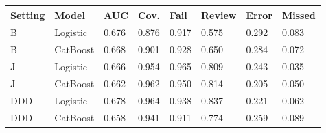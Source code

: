 \begin{tabular}{llllllll}
\toprule
Setting & Model & AUC & Cov. & Fail & Review & Error & Missed\\
\midrule
B & Logistic & 0.676 & 0.876 & 0.917 & 0.575 & 0.292 & 0.083\\
B & CatBoost & 0.668 & 0.901 & 0.928 & 0.650 & 0.284 & 0.072\\
J & Logistic & 0.666 & 0.954 & 0.965 & 0.809 & 0.243 & 0.035\\
J & CatBoost & 0.662 & 0.962 & 0.950 & 0.814 & 0.205 & 0.050\\
DDD & Logistic & 0.678 & 0.964 & 0.938 & 0.837 & 0.221 & 0.062\\
DDD & CatBoost & 0.658 & 0.941 & 0.911 & 0.774 & 0.259 & 0.089\\
\bottomrule
\end{tabular}
